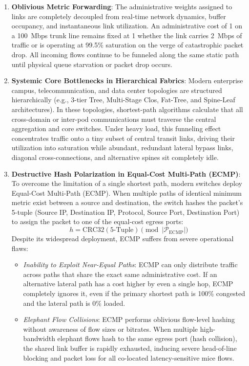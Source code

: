 \documentclass[12pt,a4paper,oneside]{report}
\begin{document}
\begin{enumerate}[label=\textbf{\arabic*.}]
    \item \textbf{Oblivious Metric Forwarding}: The administrative weights assigned to links are completely decoupled from real-time network dynamics, buffer occupancy, and instantaneous link utilization. An administrative cost of 1 on a 100~Mbps trunk line remains fixed at 1 whether the link carries 2~Mbps of traffic or is operating at 99.5\% saturation on the verge of catastrophic packet drop. All incoming flows continue to be funneled along the same static path until physical queue starvation or packet drop occurs.
    \item \textbf{Systemic Core Bottlenecks in Hierarchical Fabrics}: Modern enterprise campus, telecommunication, and data center topologies are structured hierarchically (e.g., 3-tier Tree, Multi-Stage Clos, Fat-Tree, and Spine-Leaf architectures). In these topologies, shortest-path algorithms calculate that all cross-domain or inter-pod communications must traverse the central aggregation and core switches. Under heavy load, this funneling effect concentrates traffic onto a tiny subset of central transit links, driving their utilization into saturation while abundant, redundant lateral bypass links, diagonal cross-connections, and alternative spines sit completely idle.
    \item \textbf{Destructive Hash Polarization in Equal-Cost Multi-Path (ECMP)}: To overcome the limitation of a single shortest path, modern switches deploy Equal-Cost Multi-Path (ECMP). When multiple paths of identical minimum metric exist between a source and destination, the switch hashes the packet's 5-tuple (Source IP, Destination IP, Protocol, Source Port, Destination Port) to assign the packet to one of the equal-cost egress ports:
    \begin{equation}
        h = \text{CRC32}(\text{5-Tuple}) \pmod{|\mathcal{P}_{\text{ECMP}}|}
    \end{equation}
    Despite its widespread deployment, ECMP suffers from severe operational flaws:
    \begin{itemize}
        \item \emph{Inability to Exploit Near-Equal Paths}: ECMP can only distribute traffic across paths that share the exact same administrative cost. If an alternative lateral path has a cost higher by even a single hop, ECMP completely ignores it, even if the primary shortest path is 100\% congested and the lateral path is 0\% loaded.
        \item \emph{Elephant Flow Collisions}: ECMP performs oblivious flow-level hashing without awareness of flow sizes or bitrates. When multiple high-bandwidth elephant flows hash to the same egress port (hash collision), the shared link buffer is rapidly exhausted, inducing severe head-of-line blocking and packet loss for all co-located latency-sensitive mice flows.

\end{itemize}
\end{enumerate}
\end{document}
